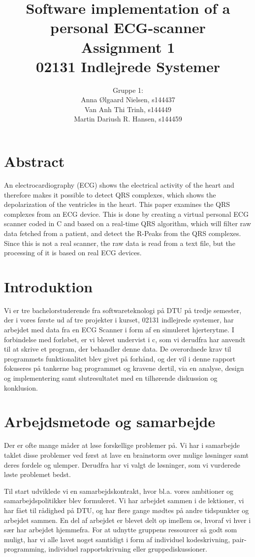 \documentclass{article}
\title{\huge Software implementation of a personal ECG-scanner \\ \LARGE Assignment 1 \\ \LARGE 02131 Indlejrede Systemer}
\author{Gruppe 1: \\Anna Ølgaard Nielsen, s144437 \\ Van Anh Thi Trinh, s144449 \\ Martin Dariush R. Hansen, s144459}
\date{\myfont \displaydate{date}}
\begin{document}
\maketitle

\newpage

\section*{Abstract}
An electrocardiography (ECG) shows the electrical activity of the heart and therefore makes it possible to detect QRS complexes, which shows the depolarization of the ventricles in the heart\cite{3}. This paper examines the QRS complexes from an ECG device. This is done by creating a virtual personal ECG scanner coded in C and based on a real-time QRS algorithm, which will filter raw data fetched from a patient, and detect the R-Peaks from the QRS complexes\cite{1}. Since this is not a real scanner, the raw data is read from a text file, but the processing of it is based on real ECG devices.

\tableofcontents

\newpage
\section{Introduktion}
Vi er tre bachelorstuderende fra softwareteknologi på DTU på tredje semester, der i vores første ud af tre projekter i kurset, 02131 indlejrede systemer, har arbejdet med data fra en ECG Scanner i form af en simuleret hjerterytme. I forbindelse med forløbet, er vi blevet undervist i c, som vi derudfra har anvendt til at skrive et program, der behandler denne data. De overordnede krav til programmets funktionalitet blev givet på forhånd, og der vil i denne rapport fokuseres på tankerne bag programmet og kravene dertil, via en analyse, design og implementering samt slutresultatet med en tilhørende diskussion og konklusion.


\newpage
\section{Arbejdsmetode og samarbejde}
Der er ofte mange måder at løse forskellige problemer på. Vi har i samarbejde taklet disse problemer ved først at lave en brainstorm over mulige løsninger samt deres fordele og ulemper. Derudfra har vi valgt de løsninger, som vi vurderede løste problemet bedst.

Til start udviklede vi en samarbejdskontrakt, hvor bl.a. vores ambitioner og samarbejdspolitikker blev formuleret. Vi har arbejdet sammen i de lektioner, vi har fået til rådighed på DTU, og har flere gange mødtes på andre tidspunkter og arbejdet sammen. En del af arbejdet er blevet delt op imellem os, hvoraf vi hver i sær har arbejdet hjemmefra. For at udnytte gruppens ressourcer så godt som muligt, har vi alle lavet noget samtidigt i form af individuel kodeskrivning, pair-programming, individuel rapportskrivning eller gruppediskussioner.
\end{document}
